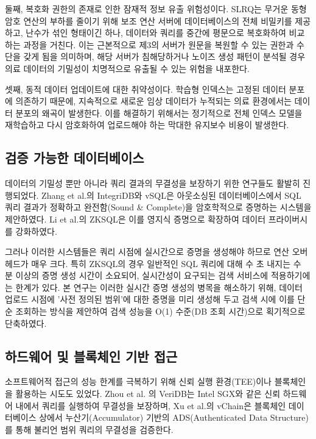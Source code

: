 둘째, 복호화 권한의 존재로 인한 잠재적 정보 유출 위험성이다. SLRQ는 무거운 동형 암호 연산의 부하를 줄이기 위해 보조 연산 서버에 데이터베이스의 전체 비밀키를 제공하고, 난수가 섞인 형태이긴 하나, 데이터와 쿼리를 중간에 평문으로 복호화하여 비교하는 과정을 거친다. 이는 근본적으로 제3의 서버가 원문을 복원할 수 있는 권한과 수단을 갖게 됨을 의미하며, 해당 서버가 침해당하거나 노이즈 생성 패턴이 분석될 경우 의료 데이터의 기밀성이 치명적으로 유출될 수 있는 위험을 내포한다.

\bigskip

셋째, 동적 데이터 업데이트에 대한 취약성이다. 학습형 인덱스는 고정된 데이터 분포에 의존하기 때문에, 지속적으로 새로운 임상 데이터가 누적되는 의료 환경에서는 데이터 분포의 왜곡이 발생한다. 이를 해결하기 위해서는 정기적으로 전체 인덱스 모델을 재학습하고 다시 암호화하여 업로드해야 하는 막대한 유지보수 비용이 발생한다.

\subsection{검증 가능한 데이터베이스}
데이터의 기밀성 뿐만 아니라 쿼리 결과의 무결성을 보장하기 위한 연구들도 활발히 진행되었다. Zhang et al.\cite{zhang2015}의 IntegriDB와 vSQL은 아웃소싱된 데이터베이스에서 SQL 쿼리 결과가 정확하고 완전함(Sound \& Complete)을 암호학적으로 증명하는 시스템을 제안하였다. Li et al.\cite{li2023}의 ZKSQL은 이를 영지식 증명으로 확장하여 데이터 프라이버시를 강화하였다.

\bigskip

그러나 이러한 시스템들은 쿼리 시점에 실시간으로 증명을 생성해야 하므로 연산 오버헤드가 매우 크다. 특히 ZKSQL의 경우 일반적인 SQL 쿼리에 대해 수 초 내지는 수 분 이상의 증명 생성 시간이 소요되어, 실시간성이 요구되는 검색 서비스에 적용하기에는 한계가 있다. 본 연구는 이러한 실시간 증명 생성의 병목을 해소하기 위해, 데이터 업로드 시점에 '사전 정의된 범위'에 대한 증명을 미리 생성해 두고 검색 시에 이를 단순 조회하는 방식을 제안하여 검색 성능을 O(1) 수준(DB 조회 시간)으로 획기적으로 단축하였다.

\subsection{하드웨어 및 블록체인 기반 접근}
소프트웨어적 접근의 성능 한계를 극복하기 위해 신뢰 실행 환경(TEE)이나 블록체인을 활용하는 시도도 있었다. Zhou et al. \cite{zhou2021}의 VeriDB는 Intel SGX와 같은 신뢰 하드웨어 내에서 쿼리를 실행하여 무결성을 보장하며, Xu et al.\cite{xu2019}의 vChain은 블록체인 데이터베이스 상에서 누산기(Accumulator) 기반의 ADS(Authenticated Data Structure)를 통해 불리언 범위 쿼리의 무결성을 검증한다. 

